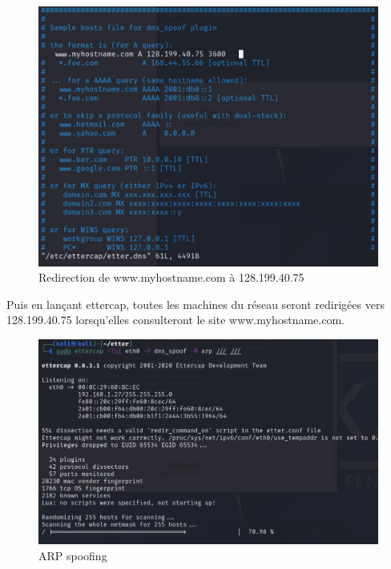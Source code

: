 \documentclass[12pt, oneside]{article}
\begin{document}
\begin{figure}[H]
\centering
\includegraphics[scale=0.4]{redirect}
\caption{Redirection de www.myhostname.com à 128.199.40.75}
\end{figure}
Puis en lançant ettercap, toutes les machines du réseau seront redirigées vers 128.199.40.75 lorsqu'elles consulteront le site www.myhostname.com.
\begin{figure}[H]
\centering
\includegraphics[scale=0.4]{dnsspoof}
\caption{ARP spoofing}
\end{figure}
\end{document}
